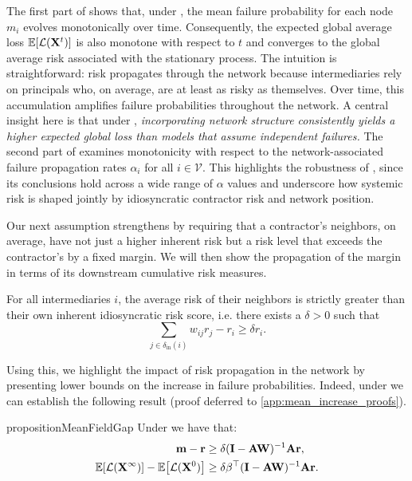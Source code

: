 \documentclass[mnsc,nonblindrev]{informs3}
\newcommand{\Exp}[1]{\mathbb E \left[ #1 \right]} %
\newcommand{\inv}{{-1}}
\newcommand{\din}{\delta_{\text{in}}}
\newcommand{\GAR}{\mathcal{L}}
\newcommand{\Xvec}{\mathbf{X}}
\newcommand{\rvec}{\mathbf{r}}
\newcommand{\V}{\mathcal{V}}
\newcommand{\A}{\mathbf{A}}
\newcommand{\W}{\mathbf{W}}
\newcommand{\I}{\mathbf{I}}
\newcommand{\mean}{m}
\newcommand{\meanvec}{\mathbf{\mean}}
\let\originalleft\left
\let\originalright\right
\renewcommand{\left}{\mathopen{}\mathclose\bgroup\originalleft}
\renewcommand{\right}{\aftergroup\egroup\originalright}
\begin{document}
The first part of  shows that, under , the mean failure probability for each node $\mean_i$ evolves monotonically over time. Consequently, the expected global average loss $\Exp{\GAR(\Xvec^t)}$ is also monotone with respect to $t$ and converges to the global average risk associated with the stationary process.
%
The intuition is straightforward: risk propagates through the network because intermediaries rely on principals who, on average, are at least as risky as themselves. Over time, this accumulation amplifies failure probabilities throughout the network.  A central insight here is that under , {\em incorporating network structure consistently yields a higher expected global loss than models that assume independent failures.}
%
The second part of  examines monotonicity with respect to the network-associated failure propagation rates $\alpha_i$ for all $i \in \V$. This highlights the robustness of , since its conclusions hold across a wide range of $\alpha$ values and underscore how systemic risk is shaped jointly by idiosyncratic contractor risk and network position.


Our next assumption strengthens  by requiring that a contractor’s neighbors, on average, have not just a higher inherent risk but a risk level that exceeds the contractor’s by a fixed margin.  We will then show the propagation of the margin in terms of its downstream cumulative risk measures.
\begin{assumption}
\label{ass:strictly_larger_neighbors}
For all intermediaries $i$, the average risk of their neighbors is strictly greater than their own inherent idiosyncratic risk score, i.e. there exists a $\delta > 0$ such that
\[\sum_{j \in \din(i)} w_{ij} r_j - r_i \geq \delta r_i.\]
\end{assumption}
Using this, we highlight the impact of {risk propagation in the network} by presenting lower bounds on the increase in failure probabilities.  Indeed, under  we can establish the following result (proof deferred to \cref{app:mean_increase_proofs}).

\begin{restatable}{proposition}{MeanFieldGap}\label{thm:gap}
Under  we have that:
\begin{align*}
    \meanvec - \rvec &\geq \delta (\I-\A\W)^\inv \A \rvec, \\
    \Exp{\GAR(\Xvec^\infty)} - \Exp{\GAR(\Xvec^0)} &\geq \delta \beta^\top (\I-\A\W)^\inv \A \rvec.
\end{align*}
\end{restatable}
\end{document}
